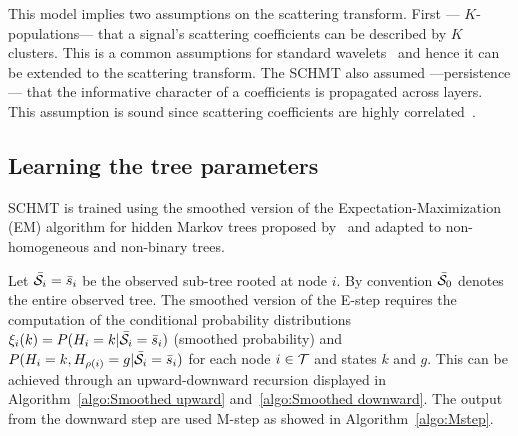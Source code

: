 \documentclass{article}
\begin{document}
    This model implies two assumptions on the scattering transform. First --- $K$-populations--- that a signal’s scattering coefficients can be described by $K$ clusters. This is a common assumptions for standard wavelets~\cite{kingsbury2001complex} and hence it can be extended to the scattering transform. The SCHMT also assumed ---persistence--- that the informative character of a coefficients is propagated across layers. This assumption is sound since scattering coefficients are highly correlated~\cite{oyallon2014deep}.
  
  \vspace{-5pt}
  \subsection{Learning the tree parameters}
    \label{subsec:SCHMT/Learning}    
    \vspace{-5pt}
    SCHMT is trained using the smoothed version of the Expectation-Maximization (EM) algorithm for hidden Markov trees proposed by~\cite{durand2001statistical} and adapted to non-homogeneous and non-binary trees.
    
    Let $\bar{\mathcal{S}}_{i}= \bar{s}_{i}$ be the observed sub-tree rooted at node $i$. By convention $\bar{\mathcal{S}}_{0}$ denotes the entire observed tree. The smoothed version of the E-step requires the computation of the conditional probability distributions $\xi_{i}(k) = P(H_{i}=k | \bar{\mathcal{S}}_{i}= \bar{s}_{i})$ (smoothed probability) and $P(H_{i}=k, H_{\rho(i)}=g | \bar{\mathcal{S}}_{i}= \bar{s}_{i})$ for each node $i \in \mathcal{T}$ and states $k$ and $g$. This can be achieved through an upward-downward recursion displayed in Algorithm~\ref{algo:Smoothed upward} and~\ref{algo:Smoothed downward}. The output from the downward step are used M-step as showed in Algorithm~\ref{algo:Mstep}.
    
\end{document}
